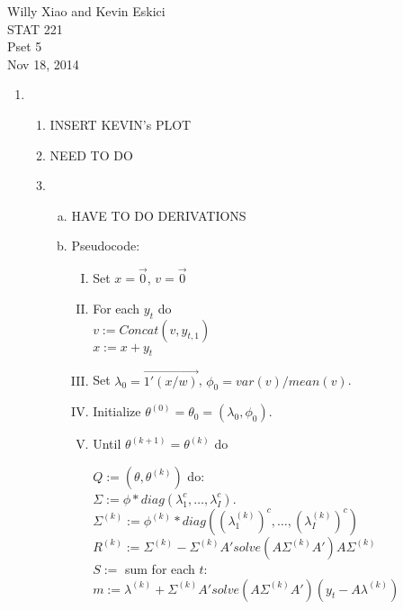 \documentclass[paper=a4, fontsize=11pt]{scrartcl}
\begin{document}
\noindent Willy Xiao and Kevin Eskici \\ STAT 221 \\Pset 5\\ Nov 18, 2014
\begin{enumerate}
  \item
    \begin{enumerate}[1]
      \item INSERT KEVIN's PLOT
      \item NEED TO DO
      \item
        \begin{enumerate}[a.]
          \item HAVE TO DO DERIVATIONS
          \item Pseudocode:
            \begin{enumerate}[I.]
              \item Set $x = \vec{0}$, $v = \vec{0}$
              \item For each $y_t$ do \\
                \indent $v := Concat(v, y_{t,1})$ \\
                \indent $x := x + y_t$
              \item Set $\lambda_0 = \overrightarrow{1'(x/w)}$, $\phi_0 = var(v)/mean(v)$.
              \item Initialize $\theta^{(0)} = \theta_0 = (\lambda_0, \phi_0)$.
              \item Until $\theta^{(k+1)} = \theta^{(k)}$ do \\
                \begin{tabbing}
                  \hspace{1cm} $Q := (\theta, \theta^{(k)})$ do: \\
                  \hspace{2cm} $\Sigma := \phi*diag(\lambda_1^c, \ldots, \lambda_I^c)$. \\
                  \hspace{2cm} $\Sigma^{(k)} := \phi^{(k)}*diag((\lambda_1^{(k)})^c, \ldots, (\lambda_I^{(k)})^c)$ \\
                  \hspace{2cm} $R^{(k)} := \Sigma^{(k)} - \Sigma^{(k)}A'solve(A\Sigma^{(k)}A')A\Sigma^{(k)}$ \\
                  \hspace{2cm} $S := $ sum for each $t$: \\
                  \hspace{3cm} $m := \lambda^{(k)} + \Sigma^{(k)}A'solve(A\Sigma^{(k)}A')(y_t - A\lambda^{(k)})$ \\

\end{tabbing}
\end{enumerate}
\end{enumerate}
\end{enumerate}
\end{enumerate}
\end{document}
